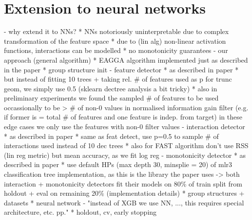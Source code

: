 \documentclass[twoside,11pt]{article}
\begin{document}
\section{Extension to neural networks}
- why extend it to NNs?
  * NNs notoriously uninterpretable due to complex transformation of the feature space
  * due to (lin alg) non-linear activation functions, interactions can be modelled
  * no monotonicity guarantees
- our approach
  (general algorithm)
  * EAGGA algorithm implemented just as described in the paper
  * group structure init
    - feature detector
      * as described in paper
      * but instead of fitting 10 trees + taking rel. \# of features used as p for trunc geom, we simply use 0.5 (sklearn dectree analysis a bit tricky)
      * also in preliminary experiments we found the sampled \# of features to be used occassionally to be > \# of non-0 values in normalised information gain filter
        (e.g. if former is = total \# of features and one feature is indep. from target) in these edge cases we only use the features with non-0 filter values
    - interaction detector
      * as described in paper
      * same as feat detect, use p=0.5 to sample \# of interactions used instead of 10 dec trees
      * also for FAST algorithm don't use RSS (lin reg metric) but mean accuracy, as we fit log reg
    - monotonicity detector
      * as described in paper
      * use default HPs (max depth 30, minsplie = 20) of mlr3 classification tree implementation, as this is the library the paper uses
    -> both interaction + monotonicity detectors fit their models on 80\% of train split from holdout + eval on remaining 20\%
  (implementation details)
  * group structures + datasets
  * neural network
    - "instead of XGB we use NN, ..., this requires special architecture, etc. pp."
  * holdout, cv, early stopping
\end{document}
